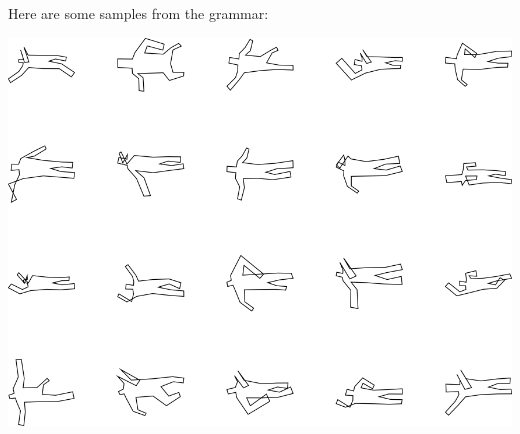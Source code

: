 Here are some samples from the grammar:

\includegraphics[width=6in]{output/3.learning/sdf_tuning/gram.6.d/samples.png}

